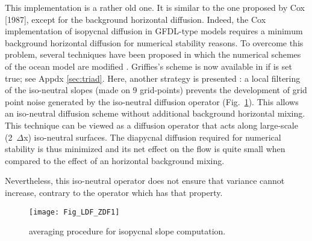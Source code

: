 \documentclass[NEMO_book]{subfiles}
\begin{document}
This implementation is a rather old one. It is similar to the one
proposed by Cox [1987], except for the background horizontal
diffusion. Indeed, the Cox implementation of isopycnal diffusion in
GFDL-type models requires a minimum background horizontal diffusion
for numerical stability reasons.  To overcome this problem, several
techniques have been proposed in which the numerical schemes of the
ocean model are modified \citep{Weaver_Eby_JPO97,
  Griffies_al_JPO98}. Griffies's scheme is now available in \NEMO if
 is set true; see Appdx \ref{sec:triad}. Here,
another strategy is presented \citep{Lazar_PhD97}: a local
filtering of the iso-neutral slopes (made on 9 grid-points) prevents
the development of grid point noise generated by the iso-neutral
diffusion operator (Fig.~\ref{Fig_LDF_ZDF1}). This allows an
iso-neutral diffusion scheme without additional background horizontal
mixing. This technique can be viewed as a diffusion operator that acts
along large-scale (2~$\Delta$x)  iso-neutral surfaces. The diapycnal diffusion required
for numerical stability is thus minimized and its net effect on the
flow is quite small when compared to the effect of an horizontal
background mixing.

Nevertheless, this iso-neutral operator does not ensure that variance cannot increase, 
contrary to the \citet{Griffies_al_JPO98} operator which has that property. 

\begin{figure}[!ht]      \begin{center}
\texttt{[image: Fig\_LDF\_ZDF1]}
\caption {    \label{Fig_LDF_ZDF1}
averaging procedure for isopycnal slope computation.}
\end{center}    \end{figure}





\end{document}
